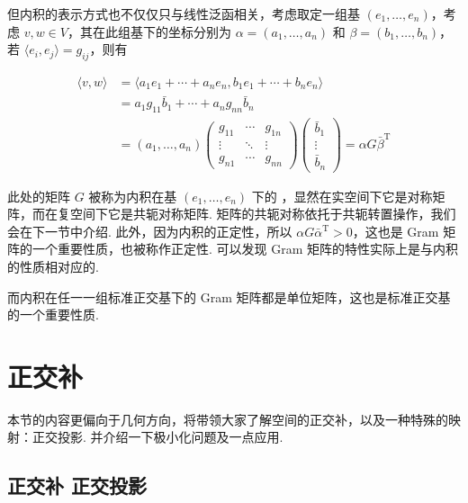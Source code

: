 但内积的表示方式也不仅仅只与线性泛函相关，考虑取定一组基 $ (e_1, \ldots , e_n) $，考虑 $ v, w \in V $，其在此组基下的坐标分别为 $ \alpha = (a_1, \ldots , a_n) $ 和 $ \beta = (b_1, \ldots , b_n) $，若 $ \langle e_i, e_j \rangle = g_{ij} $，则有

\begin{align*}
    \langle v, w \rangle & = \langle a_1e_1 + \cdots + a_ne_n, b_1e_1 + \cdots + b_ne_n \rangle \\
                         & = a_1g_{11}\bar{b}_1 + \cdots + a_ng_{nn}\bar{b}_n \\
                         & = (a_1, \ldots, a_n) \begin{pmatrix}
                            g_{11} & \cdots & g_{1n} \\
                            \vdots & \ddots & \vdots \\
                            g_{n1} & \cdots & g_{nn}
                         \end{pmatrix} \begin{pmatrix}
                            \bar{b}_1 \\
                            \vdots \\
                            \bar{b}_n
                         \end{pmatrix}
                         = \alpha G \bar{\beta}^{\mathrm{T}}
\end{align*}

此处的矩阵 $ G $ 被称为内积在基 $ (e_1, \ldots, e_n) $ 下的 ，显然在实空间下它是对称矩阵，而在复空间下它是共轭对称矩阵. 矩阵的共轭对称依托于共轭转置操作，我们会在下一节中介绍. 此外，因为内积的正定性，所以 $ \alpha G \bar{\alpha}^{\mathrm{T}} > 0$，这也是 Gram 矩阵的一个重要性质，也被称作正定性. 可以发现 Gram 矩阵的特性实际上是与内积的性质相对应的.

而内积在任一一组标准正交基下的 Gram 矩阵都是单位矩阵，这也是标准正交基的一个重要性质.

\section{正交补}

本节的内容更偏向于几何方向，将带领大家了解空间的正交补，以及一种特殊的映射：正交投影. 并介绍一下极小化问题及一点应用.

\subsection{正交补 \quad 正交投影}

